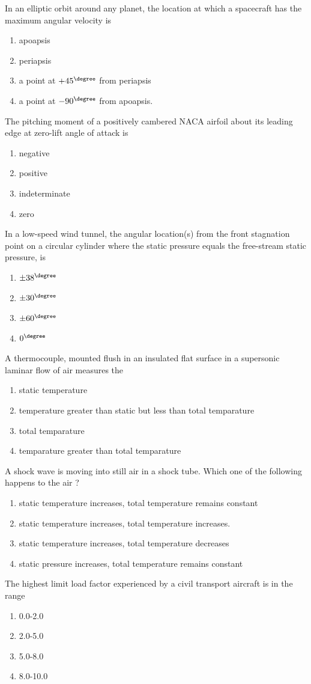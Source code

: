 \item In an elliptic orbit around any planet, the location at which a spacecraft has the maximum angular velocity is
\begin{enumerate}
    \item apoapsis
    \item periapsis
    \item a point at $+45^{\degree}$ from periapsis
    \item a point at $-90^{\degree}$ from apoapsis.
\end{enumerate}
\item The pitching moment of a positively cambered NACA airfoil about its leading edge at zero-lift  angle of attack is
\begin{enumerate}
    \item negative
    \item positive
    \item indeterminate
    \item zero
\end{enumerate}
\item In a low-speed wind tunnel, the angular location(s) from the front stagnation point on a circular cylinder where the static pressure equals the free-stream static pressure, is
\begin{enumerate}
    \item $\pm 38^{\degree}$
    \item $\pm 30^{\degree}$
    \item $\pm 60^{\degree}$
    \item $0^{\degree}$
\end{enumerate}
\item A thermocouple, mounted flush in an insulated flat surface in a supersonic laminar flow of air measures the 
\begin{enumerate}
    \item static temperature
    \item temperature greater than static but less than total temparature
    \item total temparature
    \item temparature greater than total temparature
\end{enumerate}
\item A shock wave is moving into still air in a shock tube. Which one of the following happens to the air ?
\begin{enumerate}
    \item static temperature increases, total temperature remains constant
    \item static temperature increases, total temperature increases.
    \item static temperature increases, total temperature decreases
    \item static pressure increases, total temperature remains constant
\end{enumerate}
\item The highest limit load factor experienced by a civil transport aircraft is in the range
\begin{enumerate}
    \item 0.0-2.0
    \item 2.0-5.0
    \item 5.0-8.0
    \item 8.0-10.0
\end{enumerate}

